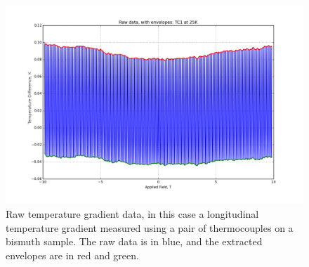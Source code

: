 \documentclass{thesis-umich}
\begin{document}
\begin{figure}
	\caption[Raw temperature gradient data]{Raw temperature gradient data, in this case a longitudinal temperature gradient measured using a pair of thermocouples on a bismuth sample. The raw data is in blue, and the extracted envelopes are in red and green.}
	\label{fig:raw_data}
	\includegraphics[width=\columnwidth]{figures/25K_TC1_Raw.png}
\end{figure}
\end{document}
